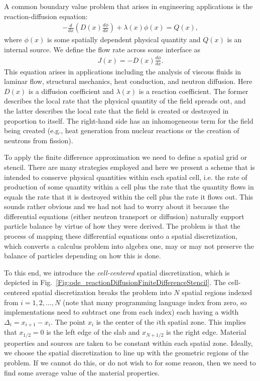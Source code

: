A common boundary value problem that arises in engineering applications is the reaction-diffusion equation:
\begin{align}
  -\frac{d}{dx} \left( D(x) \frac{d\phi}{dx} \right) + \lambda(x) \phi(x) = Q(x) ,
\end{align}
where $\phi(x)$ is some spatially dependent physical quantity and $Q(x)$ is an internal source. We define the flow rate across some interface as
\begin{align}
  J(x) = -D(x) \frac{d\phi}{dx} . \label{Eq:ode_finiteDifference_reactionDiffusion_flowRate}
\end{align}
This equation arises in applications including the analysis of viscous fluids in laminar flow, structural mechanics, heat conduction, and neutron diffusion. Here $D(x)$ is a diffusion coefficient and $\lambda(x)$ is a reaction coefficient. The former describes the local rate that the physical quantity of the field spreads out, and the latter describes the local rate that the field is created or destroyed in proportion to itself. The right-hand side has an inhomogeneous term for the field being created (e.g., heat generation from nuclear reactions or the creation of neutrons from fission).

To apply the finite difference approximation we need to define a spatial grid or stencil. There are many strategies employed and here we present a scheme that is intended to conserve physical quantities within each spatial cell, i.e. the rate of production of some quantity within a cell plus the rate that the quantity flows in equals the rate that it is destroyed within the cell plus the rate it flows out. This sounds rather obvious and we had not had to worry about it because the differential equations (either neutron transport or diffusion) naturally support particle balance by virtue of how they were derived. The problem is that the process of mapping these differential equations onto a spatial discretization, which converts a calculus problem into algebra one, may or may not preserve the balance of particles depending on how this is done. 

To this end, we introduce the \emph{cell-centered} spatial discretization, which is depicted in Fig.~\ref{Fig:ode_reactionDiffusionFiniteDifferenceStencil}. The cell-centered spatial discretization breaks the problem into $N$ spatial regions indexed from $i = 1, 2, \ldots, N$ (note that many programming language index from zero, so implementations need to subtract one from each index) each having a width $\Delta_i = x_{i+1} - x_i$. The point $x_i$ is the center of the $i$th spatial zone. This implies that $x_{1/2} = 0$ is the left edge of the slab and $x_{N+1/2}$ is the right edge. Material properties and sources are taken to be constant within each spatial zone. Ideally, we choose the spatial discretization to line up with the geometric regions of the problem. If we cannot do this, or do not wish to for some reason, then we need to find some average value of the material properties.

